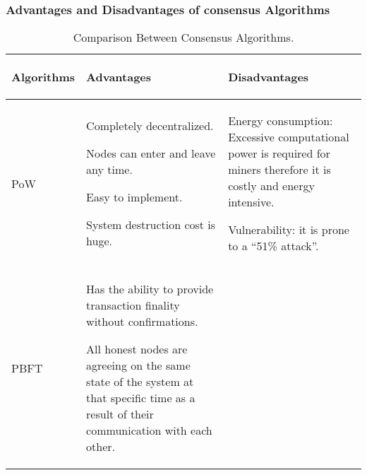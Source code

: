				\subsubsection{Advantages and Disadvantages of consensus Algorithms \cite{shrestha2020new}}
				\begin{table}[H]
					\centering
					\caption{Comparison Between Consensus Algorithms.}
					\begin{tabular}{| m{2cm} | m{7cm} | m{7cm} |}
						\hline
						\begin{center}
							Algorithms
						\end{center} & \begin{center}
							Advantages
						\end{center} & \begin{center}
							Disadvantages
						\end{center} \\
						\hline
						\begin{center}
							PoW
						\end{center} & 
						\begin{mylist}
							\item[\textminus] Completely decentralized. 
							\item[\textminus] Nodes can enter and leave any time.
							\item[\textminus] Easy to implement. 
							\item[\textminus] System destruction cost is huge.	
						\end{mylist} & 
						\begin{mylist}
							\item[\textminus] Energy consumption: Excessive computational power is required for miners therefore it is costly and energy intensive. 
							\item[\textminus] Vulnerability: it is prone to a “51\% attack”.
						\end{mylist} \\
						\hline
						\begin{center}
							PBFT
						\end{center} & 
						\begin{mylist}
							\item[\textminus] Has the ability to provide transaction finality without confirmations. 
							\item[\textminus] All honest nodes are agreeing on the same state of the system at that specific time as a result of their communication with each other. 

\end{mylist}
\end{tabular}
\end{table}
